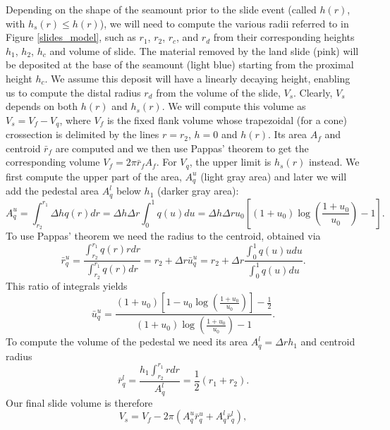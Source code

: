 \documentclass[12pt,letterpaper,margin=0.5in]{report}
\begin{document}
Depending on the shape of the seamount prior to the slide event (called $h(r)$, with $h_s(r) \le h(r)$), we will need to compute the various radii referred
to in Figure \ref{slides_model}, such as $r_1$, $r_2$, $r_c$, and $r_d$ from their corresponding heights $h_1$, $h_2$, $h_c$ and volume of slide.
The material removed by the land slide (pink)
will be deposited at the base of the seamount (light blue) starting from the proximal height $h_c$.  We assume this deposit will have a linearly
decaying height, enabling us to compute the distal radius $r_d$ from the volume of the slide, $V_s$.  Clearly, $V_s$ depends
on both $h(r)$ and $h_s(r)$.  We will compute this volume as $V_s = V_f - V_q$, where $V_f$ is the fixed flank volume whose
trapezoidal (for a cone) crossection is delimited by the lines $r = r_2$, $h = 0$ and $h(r)$.  Its area $A_f$ and centroid $\bar{r}_f$ are computed and
we then use Pappas' theorem to get the corresponding volume $V_f = 2 \pi \bar{r}_f A_f$.  For $V_q$, the upper limit is $h_s(r)$ instead. We first compute the upper part of the area, $A^u_q$ (light gray area)
and later we will add the pedestal area $A^l_q$ below $h_1$ (darker gray area):
\begin{equation}
A^u_q = \int_{r_2}^{r_1} \Delta h q(r) dr = \Delta h \Delta r \int_0^1 q(u) du = \Delta h \Delta r u_0 \left [ (1 + u_0) \log \left (\frac{1 + u_0}{u_0} \right ) - 1 \right ].
\end{equation}
To use Pappas' theorem we need the radius to the centroid, obtained via
\begin{equation}
\bar{r}^u_q = \frac{\int_{r_2}^{r_1}q(r)rdr}{\int_{r_2}^{r_1}q(r)dr} = r_2 + \Delta r \bar{u}_q^u = r_2 + \Delta r \frac{\int_0^1q(u)udu}{\int_0^1 q(u)du}.
\end{equation}
This ratio of integrals yields
\begin{equation}
\bar{u}^u_q = \frac{(1 + u_0)\left [1 - u_0 \log \left ( \frac{1+u_0}{u_0} \right ) \right ] - \frac{1}{2}}{(1 + u_0) \log \left (\frac{1 + u_0}{u_0} \right ) - 1}.
\end{equation}
To compute the volume of the pedestal we need its area $A^l_q = \Delta r h_1$ and centroid radius
\begin{equation}
\bar{r}^l_q = \frac{ h_1\int_{r_2}^{r_1} rdr}{A^l_q} = \frac{1}{2} (r_1 + r_2).
\end{equation}
Our final slide volume is therefore
\begin{equation}
V_s = V_f - 2 \pi \left (A^u_q \bar{r}^u_q + A^l_q \bar{r}^l_q \right ),
\end{equation}
\end{document}

